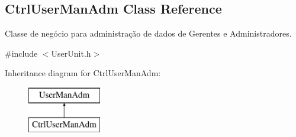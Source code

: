 \hypertarget{classCtrlUserManAdm}{\subsection{Ctrl\-User\-Man\-Adm Class Reference}
\label{d4/d17/classCtrlUserManAdm}
}


Classe de negócio para administração de dados de Gerentes e Administradores.  




{\ttfamily \#include $<$User\-Unit.\-h$>$}

Inheritance diagram for Ctrl\-User\-Man\-Adm\-:\begin{figure}[H]
\begin{center}
\leavevmode
\includegraphics[height=2.000000cm]{d4/d17/classCtrlUserManAdm}
\end{center}
\end{figure}
